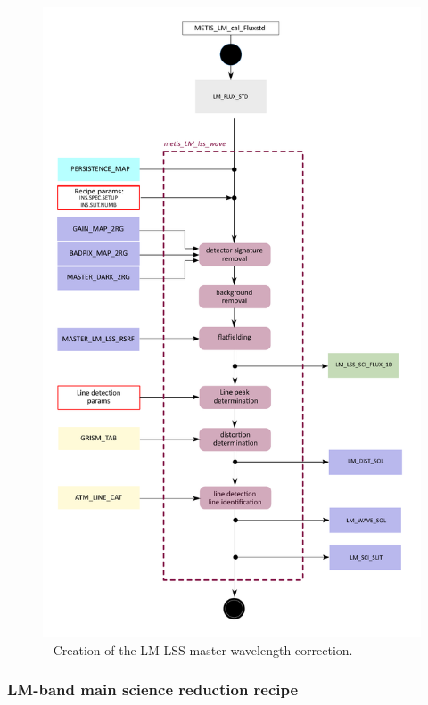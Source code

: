 \begin{figure}[ht]
  \centering
  \includegraphics[width=0.5\textheight]{figures/metis_lm_lss_wave_0.62.pdf}
  \caption[Recipe: ]{ --
    Creation of the LM LSS master wavelength correction.}
  \label{Fig:rec_lm_lss_wave}
\end{figure}
\clearpage

\subsubsection{LM-band main science reduction recipe}
\label{sssec:LM_LSS_sci}

